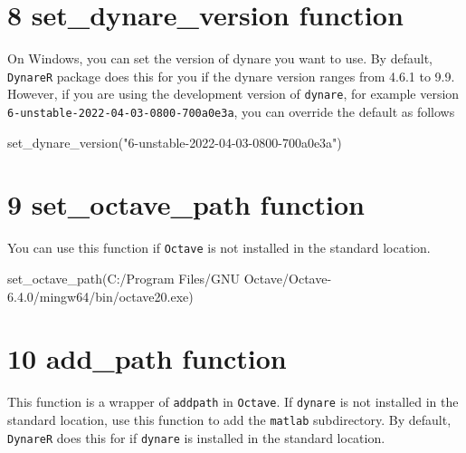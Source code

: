 \documentclass[
  12pt,
  legalpaperpaper,
  DIV=11,
  numbers=noendperiod]{scrartcl}
\newenvironment{Shaded}{\begin{snugshade}}{\end{snugshade}}
\newcommand{\FunctionTok}[1]{\textcolor[rgb]{0.28,0.35,0.67}{#1}}
\newcommand{\NormalTok}[1]{\textcolor[rgb]{0.00,0.23,0.31}{#1}}
\newcommand{\StringTok}[1]{\textcolor[rgb]{0.13,0.47,0.30}{#1}}
\begin{document}
\hypertarget{set_dynare_version-function}{%
\section{8 set\_dynare\_version
function}\label{set_dynare_version-function}}

On Windows, you can set the version of dynare you want to use. By
default, \texttt{DynareR} package does this for you if the dynare
version ranges from 4.6.1 to 9.9. However, if you are using the
development version of \texttt{dynare}, for example version
\texttt{6-unstable-2022-04-03-0800-700a0e3a}, you can override the
default as follows

\begin{Shaded}
\begin{Highlighting}[]
\FunctionTok{set\_dynare\_version}\NormalTok{(}\StringTok{"6{-}unstable{-}2022{-}04{-}03{-}0800{-}700a0e3a"}\NormalTok{)}
\end{Highlighting}
\end{Shaded}

\hypertarget{set_octave_path-function}{%
\section{9 set\_octave\_path function}\label{set_octave_path-function}}

You can use this function if \texttt{Octave} is not installed in the
standard location.

\begin{Shaded}
\begin{Highlighting}[]
\FunctionTok{set\_octave\_path}\NormalTok{(}\StringTok{\textquotesingle{}C:/Program Files/GNU Octave/Octave{-}6.4.0/mingw64/bin/octave20.exe\textquotesingle{}}\NormalTok{)}
\end{Highlighting}
\end{Shaded}

\hypertarget{add_path-function}{%
\section{10 add\_path function}\label{add_path-function}}

This function is a wrapper of \texttt{addpath} in \texttt{Octave}. If
\texttt{dynare} is not installed in the standard location, use this
function to add the \texttt{matlab} subdirectory. By default,
\texttt{DynareR} does this for if \texttt{dynare} is installed in the
standard location.
\end{document}
